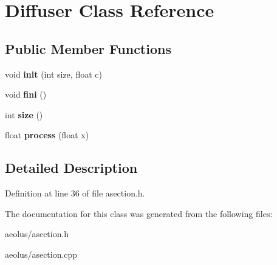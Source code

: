 \hypertarget{class_diffuser}{}\section{Diffuser Class Reference}
\label{class_diffuser}
\subsection*{Public Member Functions}
\begin{DoxyCompactItemize}
\item 
\mbox{\label{class_diffuser_a2a52f420a293fd92341b3263260ab99c}} 
void {\bfseries init} (int size, float c)
\item 
\mbox{\label{class_diffuser_a3862eb2d941d8b7e2f5dbbd0bf4ac177}} 
void {\bfseries fini} ()
\item 
\mbox{\label{class_diffuser_a84953127dc10f426bca583ff6f4bca85}} 
int {\bfseries size} ()
\item 
\mbox{\label{class_diffuser_ae86541668940fe5daaef2e18cb6bb9d7}} 
float {\bfseries process} (float x)
\end{DoxyCompactItemize}


\subsection{Detailed Description}


Definition at line 36 of file asection.\+h.



The documentation for this class was generated from the following files\+:\begin{DoxyCompactItemize}
\item 
aeolus/asection.\+h\item 
aeolus/asection.\+cpp\end{DoxyCompactItemize}
